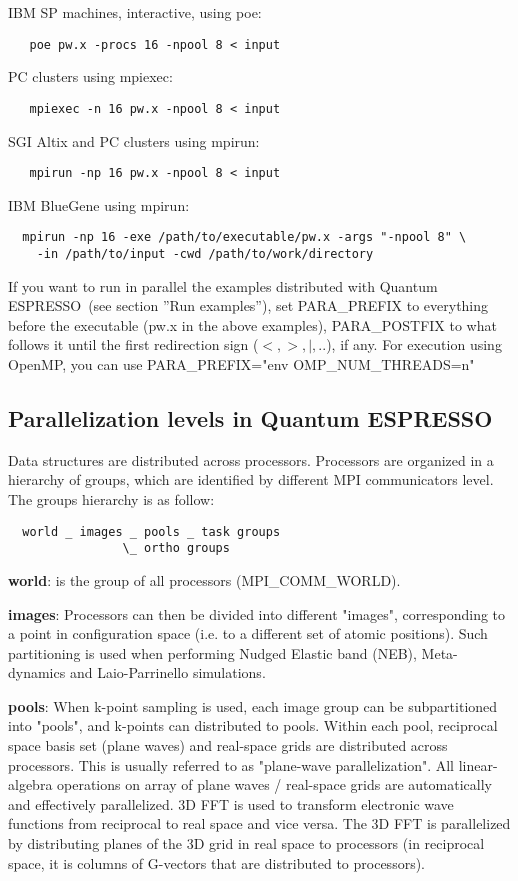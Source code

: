\documentclass[12pt,a4paper]{article}
\def\qe{{\sc Quantum ESPRESSO}}
\begin{document}
IBM SP machines, interactive, using poe:
\begin{verbatim}
   poe pw.x -procs 16 -npool 8 < input
\end{verbatim}
PC clusters using mpiexec:
\begin{verbatim}
   mpiexec -n 16 pw.x -npool 8 < input
\end{verbatim}
SGI Altix and PC clusters using mpirun:
\begin{verbatim}   mpirun -np 16 pw.x -npool 8 < input
\end{verbatim}
IBM BlueGene using mpirun:
 \begin{verbatim}
  mpirun -np 16 -exe /path/to/executable/pw.x -args "-npool 8" \
    -in /path/to/input -cwd /path/to/work/directory
\end{verbatim}
If you want to run in parallel the examples distributed with \qe\
(see section ''Run examples''), set PARA\_PREFIX to everything
before the executable (pw.x in the above examples),
PARA\_POSTFIX to what follows it until the first redirection sign 
($<, >, |,..$), if any. For execution using OpenMP, you can
use PARA\_PREFIX="env OMP\_NUM\_THREADS=n"

\subsection{Parallelization levels in \qe}

Data structures are distributed across processors.
Processors are organized in a hierarchy of groups, 
which are identified by different MPI communicators level.
The groups hierarchy is as follow:
\begin{verbatim}
  world _ images _ pools _ task groups
                \_ ortho groups
\end{verbatim}

{\bf world}: is the group of all processors (MPI\_COMM\_WORLD).

{\bf images}: Processors can then be divided into different "images",
corresponding to a point in configuration space (i.e. to
a different set of atomic positions). Such partitioning 
is used when performing Nudged Elastic band (NEB), Meta-dynamics 
and Laio-Parrinello simulations.

{\bf pools}: When k-point sampling is used, each image group can be 
subpartitioned into "pools", and k-points can distributed to pools.
Within each pool, reciprocal space basis set (plane waves)
and real-space grids are distributed across processors.
This is usually referred to as "plane-wave parallelization".
All linear-algebra operations on array of  plane waves / 
real-space grids are automatically and effectively parallelized.
3D FFT is used to transform electronic wave functions from
reciprocal to real space and vice versa. The 3D FFT is
parallelized by distributing planes of the 3D grid in real
space to processors (in reciprocal space, it is columns of
G-vectors that are distributed to processors). 
\end{document}

